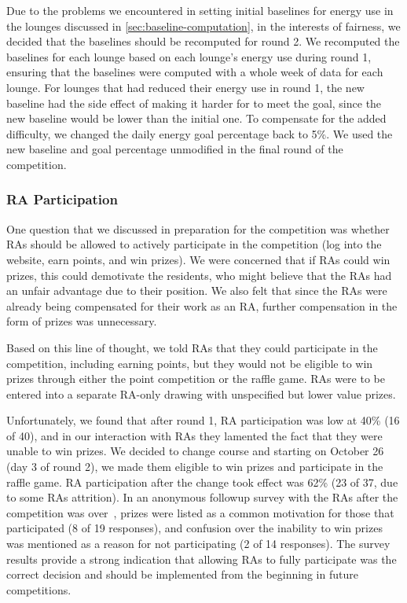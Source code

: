 Due to the problems we encountered in setting initial baselines for energy use in the lounges discussed in \autoref{sec:baseline-computation}, in the interests of fairness, we decided that the baselines should be recomputed for round 2. We recomputed the baselines for each lounge based on each lounge's energy use during round 1, ensuring that the baselines were computed with a whole week of data for each lounge. For lounges that had reduced their energy use in round 1, the new baseline had the side effect of making it harder for to meet the goal, since the new baseline would be lower than the initial one. To compensate for the added difficulty, we changed the daily energy goal percentage back to 5\%. We used the new baseline and goal percentage unmodified in the final round of the competition.


\subsubsection{RA Participation}

One question that we discussed in preparation for the competition was whether RAs should be allowed to actively participate in the competition (log into the website, earn points, and win prizes). We were concerned that if RAs could win prizes, this could demotivate the residents, who might believe that the RAs had an unfair advantage due to their position. We also felt that since the RAs were already being compensated for their work as an RA, further compensation in the form of prizes was unnecessary.

Based on this line of thought, we told RAs that they could participate in the competition, including earning points, but they would not be eligible to win prizes through either the point competition or the raffle game. RAs were to be entered into a separate RA-only drawing with unspecified but lower value prizes. 

Unfortunately, we found that after round 1, RA participation was low at 40\% (16 of 40), and in our interaction with RAs they lamented the fact that they were unable to win prizes. We decided to change course and starting on October 26 (day 3 of round 2), we made them eligible to win prizes and participate in the raffle game. RA participation after the change took effect was 62\% (23 of 37, due to some RAs attrition). In an anonymous followup survey with the RAs after the competition was over~\cite{csdl2-11-08}, prizes were listed as a common motivation for those that participated (8 of 19 responses), and confusion over the inability to win prizes was mentioned as a reason for not participating (2 of 14 responses). The survey results provide a strong indication that allowing RAs to fully participate was the correct decision and should be implemented from the beginning in future competitions.



